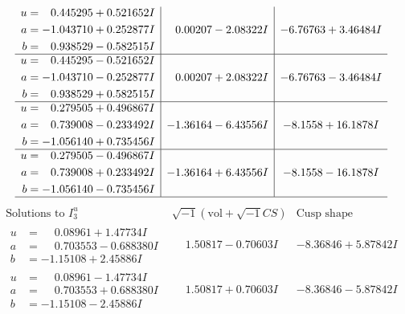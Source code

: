 \documentclass[1p]{elsarticle_modified}
\theoremstyle{definition}
\newcommand{\I}{\sqrt{-1}}
\begin{document}
$$\begin{array}{c|c|c}
\begin{aligned}
u &= \phantom{-}0.445295 + 0.521652 I \\
a &= -1.043710 + 0.252877 I \\
b &= \phantom{-}0.938529 - 0.582515 I\end{aligned}
 & \phantom{-}0.00207 - 2.08322 I & -6.76763 + 3.46484 I \\ \hline\begin{aligned}
u &= \phantom{-}0.445295 - 0.521652 I \\
a &= -1.043710 - 0.252877 I \\
b &= \phantom{-}0.938529 + 0.582515 I\end{aligned}
 & \phantom{-}0.00207 + 2.08322 I & -6.76763 - 3.46484 I \\ \hline\begin{aligned}
u &= \phantom{-}0.279505 + 0.496867 I \\
a &= \phantom{-}0.739008 - 0.233492 I \\
b &= -1.056140 + 0.735456 I\end{aligned}
 & -1.36164 - 6.43556 I & -8.1558 + 16.1878 I \\ \hline\begin{aligned}
u &= \phantom{-}0.279505 - 0.496867 I \\
a &= \phantom{-}0.739008 + 0.233492 I \\
b &= -1.056140 - 0.735456 I\end{aligned}
 & -1.36164 + 6.43556 I & -8.1558 - 16.1878 I\\
 \hline 
 \end{array}$$\newpage$$\begin{array}{c|c|c}  
\text{Solutions to }I^u_{3}& \I (\text{vol} + \sqrt{-1}CS) & \text{Cusp shape}\\
 \hline 
\begin{aligned}
u &= \phantom{-}0.08961 + 1.47734 I \\
a &= \phantom{-}0.703553 - 0.688380 I \\
b &= -1.15108 + 2.45886 I\end{aligned}
 & \phantom{-}1.50817 - 0.70603 I & -8.36846 + 5.87842 I \\ \hline\begin{aligned}
u &= \phantom{-}0.08961 - 1.47734 I \\
a &= \phantom{-}0.703553 + 0.688380 I \\
b &= -1.15108 - 2.45886 I\end{aligned}
 & \phantom{-}1.50817 + 0.70603 I & -8.36846 - 5.87842 I \\ \hline\begin{aligned}

\end{aligned}
\end{array}$$
\end{document}
